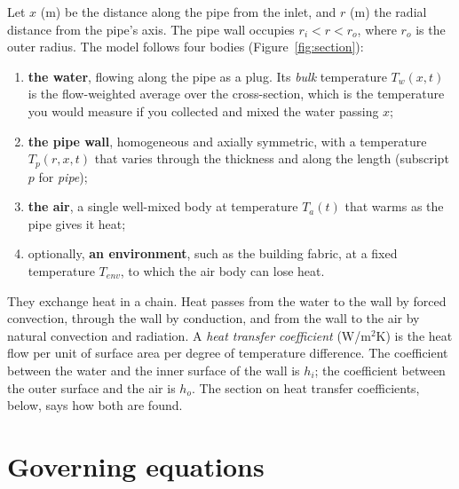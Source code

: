 \documentclass[a4paper,justified]{tufte-handout}
\begin{document}
Let $x$ (m) be the distance along the pipe from the inlet, and $r$ (m) the
radial distance from the pipe's axis. The pipe wall occupies $r_i<r<r_o$, where
$r_o$ is the outer radius. The model follows four bodies
(Figure~\ref{fig:section}):
\begin{enumerate}
  \item \textbf{the water}, flowing along the pipe as a plug. Its
    \emph{bulk} temperature $T_w(x,t)$ is the flow-weighted average over the
    cross-section, which is the temperature you would measure if you collected
    and mixed the water passing $x$;
  \item \textbf{the pipe wall}, homogeneous and axially symmetric, with a
    temperature $T_p(r,x,t)$ that varies through the thickness and along the
    length (subscript $p$ for \emph{pipe});
  \item \textbf{the air}, a single well-mixed body at temperature $T_a(t)$ that
    warms as the pipe gives it heat;
  \item optionally, \textbf{an environment}, such as the building fabric, at a
    fixed temperature $T_{env}$, to which the air body can lose heat.
\end{enumerate}
They exchange heat in a chain. Heat passes from the water to the wall by forced
convection, through the wall by conduction, and from the wall to the air by
natural convection and radiation. A \emph{heat transfer coefficient}
(W/m$^2$K) is the heat flow per unit of surface area per degree of temperature
difference. The coefficient between the water and the inner surface of the wall
is $h_i$; the coefficient between the outer surface and the air is $h_o$.
The section on heat transfer coefficients, below, says how both are found.

\section{Governing equations}
\end{document}
